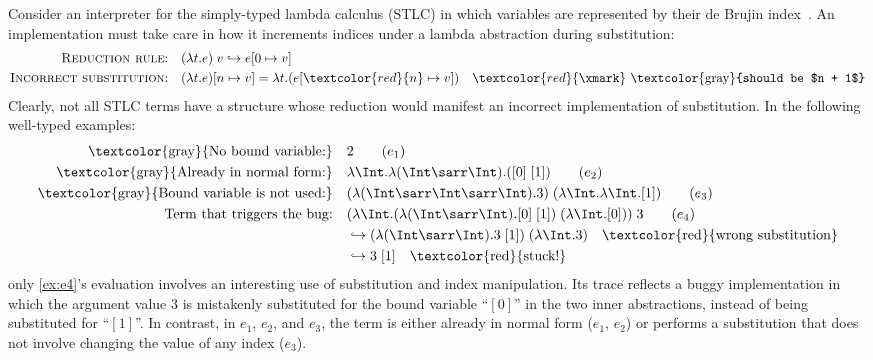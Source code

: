 \begin{example}
Consider an interpreter for the simply-typed lambda calculus (STLC) in
which variables are represented by their de Brujin
index~\cite{DeBruijn}.  An implementation must take care in how it
increments indices under a lambda abstraction during substitution:
\begin{align*}
  \text{\textsc{Reduction rule}:} \quad & (\lambda t. e)\; v \hookrightarrow e [0 \mapsto v]\\
  \text{\textsc{Incorrect substitution}:} \quad & (\lambda t. e)[n \mapsto v] = \lambda t. (e[\textcolor{red}{n} \mapsto v]) \quad \textcolor{red}{\xmark} \text{ \textcolor{gray}{should be $n + 1$}}
\end{align*}\noindent
Clearly, not all STLC terms have a structure whose reduction would
manifest an incorrect implementation of substitution.  In the following well-typed examples:
\begin{align*}
  \text{\textcolor{gray}{No bound variable:}} \quad & 2 \label{ex:e1}\tag{$e_1$}\\
  \text{\textcolor{gray}{Already in normal form:}} \quad & \lambda \Int. \lambda (\Int\sarr\Int).  ([0]\;[1]) \label{ex:e2}\tag{$e_2$}\\
  \text{\textcolor{gray}{Bound variable is not used:}} \quad & (\lambda (\Int\sarr\Int\sarr\Int). 3)\; (\lambda \Int. \lambda \Int. [1]) \label{ex:e3}\tag{$e_3$}\\
  \text{Term that triggers the bug:} \quad & (\lambda \Int. (\lambda (\Int\sarr\Int). [0]\;[1])\; (\lambda \Int. [0]))\; 3 \label{ex:e4}\tag{$e_4$}\\
  &\hookrightarrow (\lambda (\Int\sarr\Int). 3\;[1])\; (\lambda \Int. 3)  \quad \text{\textcolor{red}{wrong substitution}} \\
  &\hookrightarrow  3\;[1] \quad \text{\textcolor{red}{stuck!}}
\end{align*}\noindent
only \ref{ex:e4}'s evaluation involves an interesting use of
substitution and index manipulation.  Its trace reflects a buggy implementation
in which the argument value $3$ is mistakenly substituted for the
bound variable ``$[0]$'' in the two inner abstractions, instead of
being substituted for ``$[1]$''. In contrast, in $e_1$, $e_2$, and $e_3$,
the term is either already in normal form ($e_1$, $e_2$)
or performs a substitution that does not involve changing the value of
any index ($e_3$).


\end{example}
